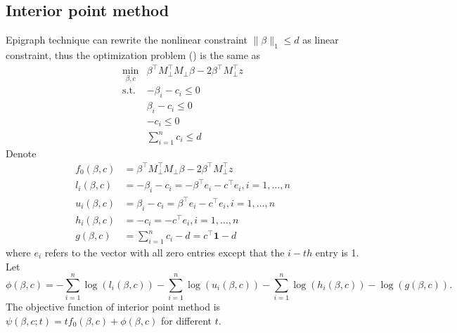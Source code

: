 \documentclass[final,onefignum,onetabnum]{siamart190516}
\begin{document}
\subsection{Interior point method}
Epigraph technique can rewrite the nonlinear constraint $\|\beta\|_1\leq d$ as linear constraint, thus the optimization problem () is the same as
\begin{equation}
    \begin{aligned}
    \min_{\beta, c}& \beta^\top M_{\perp}^\top M_{\perp}\beta-2\beta^\top M_{\perp}^\top z\\
    \text{s.t. }&-\beta_i- c_i\leq 0\\
    &\beta_i-c_i\leq 0\\
    &-c_i\leq 0\\
    &\sum_{i=1}^n c_i\leq d    
    \end{aligned}
\end{equation}
Denote
\begin{equation}\label{func_val}
    \begin{aligned}
        f_0(\beta, c) &= \beta^\top M_{\perp}^\top M_{\perp}\beta-2\beta^\top M_{\perp}^\top z \\
    l_i(\beta, c) &= -\beta_i-c_i = -\beta^\top e_i-c^\top e_i, i = 1,\dots, n\\
    u_i(\beta, c) &= \beta_i - c_i = \beta^\top e_i - c^\top e_i, i = 1, \dots, n\\    
    h_i(\beta, c) &= -c_i = -c^\top e_i, i = 1, \dots, n\\
    g(\beta, c) &= \sum_{i=1}^n c_i - d = c^\top \mathbf{1} - d
    \end{aligned}
\end{equation}
where $e_i$ refers to the vector with all zero entries except that the $i-th$ entry is 1. Let
\begin{equation}
    \phi(\beta, c) = -\sum_{i=1}^n \log (l_i(\beta, c)) - \sum_{i=1}^n \log (u_i(\beta, c)) - \sum_{i=1}^n \log (h_i(\beta, c)) -\log (g(\beta, c)).
\end{equation}
The objective function of interior point method is $\psi(\beta,c;t) = tf_0(\beta, c) + \phi(\beta, c)$ for different $t$.
\end{document}
